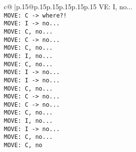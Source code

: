 \documentclass{article}
\begin{document}
{\begin{supertabular}{c@{$\;$}|p{.15\linewidth}@{}p{.15\linewidth}p{.15\linewidth}p{.15\linewidth}p{.15\linewidth}p{.15\linewidth}}
{{{VE: I, no...\\ \tt  MOVE: C -> where?!\\ \tt  MOVE: I -> no...\\ \tt  MOVE: C, no...\\ \tt  MOVE: C -> no...\\ \tt  MOVE: C, no...\\ \tt  MOVE: I, no...\\ \tt  MOVE: C, no...\\ \tt  MOVE: I -> no...\\ \tt  MOVE: I -> no...\\ \tt  MOVE: C, no...\\ \tt  MOVE: C -> no...\\ \tt  MOVE: C -> no...\\ \tt  MOVE: C, no...\\ \tt  MOVE: I, no...\\ \tt  MOVE: I -> no...\\ \tt  MOVE: C, no...\\ \tt  MOVE: C, no}}}
\end{supertabular}}
\end{document}
